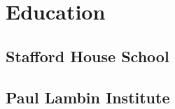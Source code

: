 \documentclass[letterpaper]{my-resume} %
\begin{document}
\begin{minipage}[t]{0.33\textwidth} %


\section{Education} 

\subsection{Stafford House School}



\sectionspace %


\subsection{Paul Lambin Institute}


\end{minipage}
\end{document}
